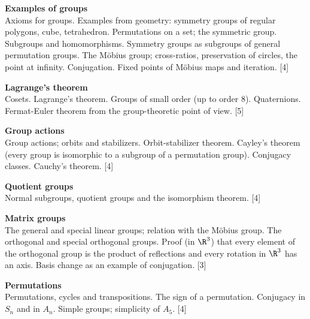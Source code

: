 \documentclass[a4paper]{article}
\begin{document}
\maketitle
{\small
  \noindent\textbf{Examples of groups}\\
  Axioms for groups. Examples from geometry: symmetry groups of regular polygons, cube, tetrahedron. Permutations on a set; the symmetric group. Subgroups and homomorphisms. Symmetry groups as subgroups of general permutation groups. The M\"obius group; cross-ratios, preservation of circles, the point at infinity. Conjugation. Fixed points of M\"obius maps and iteration.\hspace*{\fill} [4]

  \vspace{10pt}
  \noindent\textbf{Lagrange's theorem}\\
  Cosets. Lagrange's theorem. Groups of small order (up to order 8). Quaternions. Fermat-Euler theorem from the group-theoretic point of view.\hspace*{\fill} [5]

  \vspace{10pt}
  \noindent\textbf{Group actions}\\
  Group actions; orbits and stabilizers. Orbit-stabilizer theorem. Cayley's theorem (every group is isomorphic to a subgroup of a permutation group). Conjugacy classes. Cauchy's theorem.\hspace*{\fill} [4]

  \vspace{10pt}
  \noindent\textbf{Quotient groups}\\
  Normal subgroups, quotient groups and the isomorphism theorem.\hspace*{\fill} [4]

  \vspace{10pt}
  \noindent
  \textbf{Matrix groups}\\
  The general and special linear groups; relation with the M\"obius group. The orthogonal and special orthogonal groups. Proof (in $\R^3$) that every element of the orthogonal group is the product of reflections and every rotation in $\R^3$ has an axis. Basis change as an example of conjugation.\hspace*{\fill} [3]

  \vspace{10pt}
  \noindent\textbf{Permutations}\\
  Permutations, cycles and transpositions. The sign of a permutation. Conjugacy in $S_n$ and in $A_n$. Simple groups; simplicity of $A_5$.\hspace*{\fill} [4]}
\tableofcontents
\end{document}
